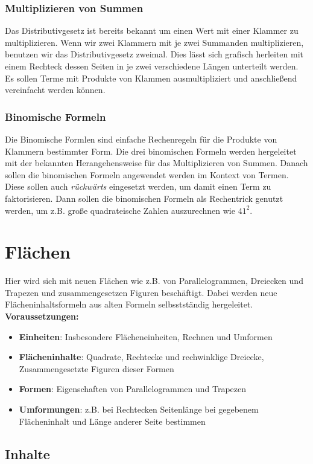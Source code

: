 \documentclass{article}
\begin{document}
\subsubsection*{Multiplizieren von Summen}
Das Distributivgesetz ist bereits bekannt um einen Wert mit einer Klammer zu multiplizieren. 
Wenn wir zwei Klammern mit je zwei Summanden multiplizieren, benutzen wir das Distributivgesetz zweimal.
Dies lässt sich grafisch herleiten mit einem Rechteck dessen Seiten in je zwei verschiedene Längen unterteilt werden.
Es sollen Terme mit Produkte von Klammen ausmultipliziert und anschließend vereinfacht werden können.
\subsubsection*{Binomische Formeln}
Die Binomische Formlen sind einfache Rechenregeln für die Produkte von Klammern bestimmter Form.
Die drei binomischen Formeln werden hergeleitet mit der bekannten Herangehensweise für das Multiplizieren von Summen.
Danach sollen die binomischen Formeln angewendet werden im Kontext von Termen. Diese sollen auch \textit{rückwärts} eingesetzt werden, um damit einen Term zu faktorisieren.
Dann sollen die binomischen Formeln als Rechentrick genutzt werden, um z.B. große quadrateische Zahlen auszurechnen wie $41^2$.
\newpage
\section{Flächen}
Hier wird sich mit neuen Flächen wie z.B. von Parallelogrammen, Dreiecken und Trapezen und zusammengesetzen Figuren beschäftigt. 
Dabei werden neue Flächeninhaltsformeln aus alten Formeln selbsstständig hergeleitet.
\textbf{Voraussetzungen: }
\begin{itemize}
    \item \textbf{Einheiten}: Insbesondere Flächeneinheiten, Rechnen und Umformen
    \item \textbf{Flächeninhalte}: Quadrate, Rechtecke und rechwinklige Dreiecke, Zusammengesetzte Figuren dieser Formen
    \item \textbf{Formen}: Eigenschaften von Parallelogrammen und Trapezen
    \item \textbf{Umformungen}: z.B. bei Rechtecken Seitenlänge bei gegebenem Flächeninhalt und Länge anderer Seite bestimmen
\end{itemize}
\subsection{Inhalte}
\end{document}
